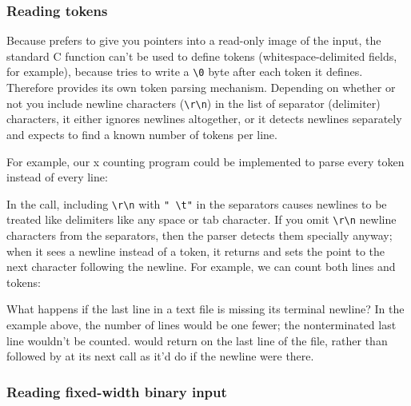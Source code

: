 \subsubsection{Reading tokens}

Because  prefers to give you pointers into a
read-only image of the input, the standard C  function
can't be used to define tokens (whitespace-delimited fields, for
example), because  tries to write a \verb+\0+ byte
after each token it defines. Therefore  provides
its own token parsing mechanism. Depending on whether or not you
include newline characters (\verb+\r\n+) in the list of separator
(delimiter) characters, it either ignores newlines altogether, or it
detects newlines separately and expects to find a known number of
tokens per line.

For example, our x counting program could be implemented to parse
every token instead of every line:




In the  call, including \verb+\r\n+
with \verb+" \t"+ in the separators causes newlines to be treated like
delimiters like any space or tab character. If you omit \verb+\r\n+
newline characters from the separators, then the parser detects them
specially anyway; when it sees a newline instead of a token, it
returns  and sets the point to the next character
following the newline. For example, we can count both lines and
tokens:




What happens if the last line in a text file is missing its terminal
newline? In the example above, the number of lines would be one fewer;
the nonterminated last line wouldn't be
counted.  would return 
on the last line of the file, rather than  followed by
 at its next call as it'd do if the newline were there.


\subsubsection{Reading fixed-width binary input}

